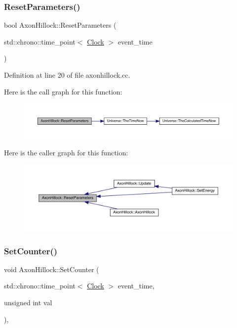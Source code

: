 \subsubsection{\texorpdfstring{Reset\+Parameters()}{ResetParameters()}}
{\footnotesize\ttfamily bool Axon\+Hillock\+::\+Reset\+Parameters (\begin{DoxyParamCaption}\item[{std\+::chrono\+::time\+\_\+point$<$ \hyperlink{universe_8h_a0ef8d951d1ca5ab3cfaf7ab4c7a6fd80}{Clock} $>$}]{event\+\_\+time }\end{DoxyParamCaption})}



Definition at line 20 of file axonhillock.\+cc.

Here is the call graph for this function\+:\nopagebreak
\begin{figure}[H]
\begin{center}
\leavevmode
\includegraphics[width=350pt]{class_axon_hillock_acec1571ef0b74f7f5ce6699c9b459b4f_cgraph}
\end{center}
\end{figure}
Here is the caller graph for this function\+:
\nopagebreak
\begin{figure}[H]
\begin{center}
\leavevmode
\includegraphics[width=350pt]{class_axon_hillock_acec1571ef0b74f7f5ce6699c9b459b4f_icgraph}
\end{center}
\end{figure}
\mbox{\label{class_axon_hillock_a0220cee0ad99ddc48496982078c1856c}} 
\subsubsection{\texorpdfstring{Set\+Counter()}{SetCounter()}}
{\footnotesize\ttfamily void Axon\+Hillock\+::\+Set\+Counter (\begin{DoxyParamCaption}\item[{std\+::chrono\+::time\+\_\+point$<$ \hyperlink{universe_8h_a0ef8d951d1ca5ab3cfaf7ab4c7a6fd80}{Clock} $>$}]{event\+\_\+time,  }\item[{unsigned int}]{val }\end{DoxyParamCaption})\hspace{0.3cm}{\ttfamily [inline]}, {\ttfamily [virtual]}}



